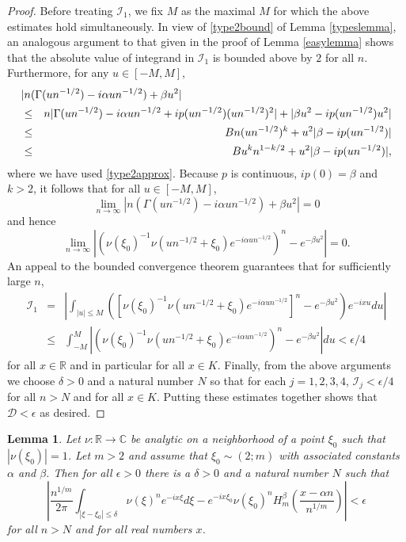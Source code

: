 \documentclass{article}
\theoremstyle{theorem}
\newtheorem{lemma}[theorem]{Lemma}
\theoremstyle{remark}
\begin{document}
\begin{proof}
Before treating $\mathcal{I}_1$, we fix $M$ as the maximal $M$ for which the above estimates hold simultaneously. In view of \eqref{type2bound} of Lemma \ref{typeslemma}, an analogous argument to that given in the proof of Lemma \ref{easylemma} shows that the absolute value of integrand in $\mathcal{I}_1$ is bounded above by $2$ for all $n$. Furthermore, for any $u\in [-M,M]$,
\begin{eqnarray*}
\lefteqn{|n(\Gamma(un^{-1/2})-i\alpha un^{-1/2})+\beta u^2|}\\
&\leq& n|\Gamma(un^{-1/2})-i\alpha un^{-1/2}+ip(u n^{-1/2}) (un^{-1/2})^2|+|\beta u^2-ip(u n^{-1/2})u^2|\\
&\leq& Bn(u n^{-1/2})^k+u^2|\beta-ip(un^{-1/2})|\\
&\leq& Bu^k n^{1-k/2}+u^2|\beta-ip(un^{-1/2})|,
\end{eqnarray*}
where we have used \eqref{type2approx}. Because $p$ is continuous, $ip(0)=\beta$ and $k>2$, it follows that for all $u\in [-M,M]$,
\begin{equation*}
\lim_{n\rightarrow\infty}|n(\Gamma(un^{-1/2})-i\alpha un^{-1/2})+\beta u^2|=0
\end{equation*}
and hence
\begin{equation*}
 \lim_{n\rightarrow \infty} \left|\left(\nu(\xi_0)^{-1}\nu(un^{-1/2}+\xi_0)e^{-i\alpha un^{-1/2}}\right)^n-e^{-\beta u^2}\right|=0.
\end{equation*}
An appeal to the bounded convergence theorem guarantees that for sufficiently large $n$, 
\begin{eqnarray*}
 \mathcal{I}_1&=&\left|\int_{|u|\leq M}\left([\nu(\xi_0)^{-1}\nu(un^{-1/2}+\xi_0)e^{-i\alpha un^{-1/2}}]^n-e^{-\beta u^2}\right)e^{-ixu}du\right|\\
&\leq& \int_{-M}^{M}\left|\left(\nu(\xi_0)^{-1}\nu(un^{-1/2}+\xi_0)e^{-i\alpha un^{-1/2}}\right)^n-e^{-\beta u^2}\right|du<\epsilon/4
\end{eqnarray*}
for all $x\in \mathbb{R}$ and in particular for all $x\in K$. Finally, from the above arguments we choose $\delta>0$ and a natural number $N$ so that for each $j=1,2,3,4$, $\mathcal{I}_j<\epsilon/4$ for all $n>N$ and for all $x\in K$. Putting these estimates together shows that $\mathcal{D}<\epsilon$ as desired. 
\end{proof}

\begin{lemma}\label{hardlemma2m}
Let $\nu:\mathbb{R}\rightarrow \mathbb{C}$ be analytic on a neighborhood of a point $\xi_0$ such that $|\nu(\xi_0)|=1$. Let $m>2$ and assume that $\xi_0\sim(2;m)$ with associated constants $\alpha$ and $\beta$. Then for all $\epsilon>0$ there is a $\delta>0$ and a natural number $N$ such that 
 \begin{equation}
\left|\frac{n^{1/m}}{2\pi}\int_{|\xi-\xi_0|\leq\delta}\nu(\xi)^n
e^{-ix\xi}d\xi-e^{-ix\xi_0}\nu(\xi_0)^n H_{m}^{\beta}\left(\frac{x-\alpha
n}{n^{1/m}}\right)\right|<\epsilon
\end{equation}
for all $n>N$ and for all real numbers $x$.
\end{lemma}
\end{document}

